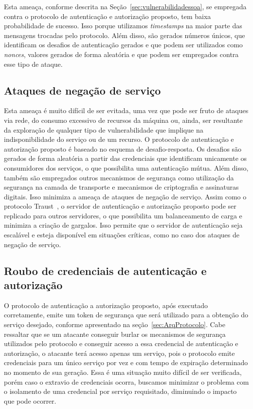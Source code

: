Esta ameaça, conforme descrita na Seção~\ref{sec:vulnerabilidadessoa}, se empregada contra o protocolo de autenticação e autorização proposto, tem baixa probabilidade de sucesso. Isso porque utilizamos \emph{timestamps} na maior parte das mensagens trocadas pelo protocolo. Além disso, são gerados números únicos, que identificam os desafios de autenticação gerados e que podem ser utilizados como \emph{nonces}, valores gerados de forma aleat\'{o}ria e que podem ser empregados contra esse tipo de ataque.

\subsection{Ataques de negação de serviço}

Esta ameaça é muito difícil de ser evitada, uma vez que  pode ser fruto de ataques via rede, do consumo excessivo de recursos da máquina  ou, ainda, ser resultante da exploração de qualquer tipo de vulnerabilidade que implique na indisponibilidade do serviço ou de um recurso. O protocolo de autenticação e autorização proposto é baseado no esquema de desafio-resposta. Os desafios são gerados de forma aleatória a partir das credenciais que identificam unicamente os consumidores dos serviços, o que possibilita uma autenticação mútua. Além disso, também são empregados outros mecanismos de segurança como utilização da segurança na camada de transporte e mecanismos de criptografia e assinaturas digitais. Isso minimiza a ameaça de ataques de negação de serviço. Assim como o protocolo Traust~\cite{traust08}, o servidor de autenticação e autorização proposto pode ser replicado para outros servidores, o que possibilita um balanceamento de carga e minimiza a criação de gargalos. Isso permite que o servidor de autenticação seja escalável e esteja disponível em situações críticas, como no caso dos ataques de negação de serviço.


\subsection{Roubo de credenciais de autenticação e autorização}\label{subsec:RouboCred}

O protocolo de autenticação a autorização proposto, após executado corretamente, emite um token de segurança que será utilizado para a obtenção do serviço desejado, conforme apresentado na seção~\ref{sec:ArqProtocolo}. Cabe ressaltar que se um atacante conseguir burlar os mecanismos de segurança utilizados pelo protocolo e conseguir acesso a essa credencial de autenticação e autorização, o atacante terá acesso apenas um serviço, pois o protocolo emite credenciais para um único serviço por vez e com tempo de expiração determinado no momento de sua geração. Essa é uma situação muito difícil de ser verificada, porém caso o extravio de credenciais ocorra, buscamos minimizar o problema com o
isolamento de uma credencial por servi\c co requisitado, diminuindo o impacto que pode ocorrer.

